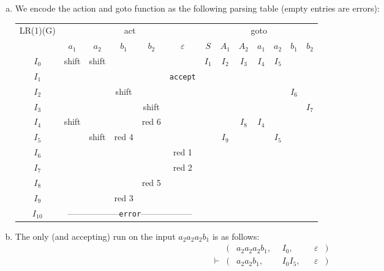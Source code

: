 \begin{solution}
\begin{enumerate}[(a)]
\item We encode the action and goto function as the following parsing table (empty entries are errors):
    \begin{center}
    \begin{tabular}{c | c c c c c | c c c c c c c }
      LR(1)(G) & \multicolumn{5}{c|}{act}                       & \multicolumn{7}{c}{goto}\\
               & $a_1$ & $a_2$ & $b_1$ & $b_2$ & $\varepsilon$ & $S$   & $A_1$ & $A_2$ & $a_1$ & $a_2$ & $b_1$ & $b_2$\\
      \hline
      $I_0$    & shift & shift &       &       &               & $I_1$ & $I_2$ & $I_3$ & $I_4$ & $I_5$ &\\
      $I_1$    &       &       &       &       &\texttt{accept}& \\
      $I_2$    &       &       & shift &       &               &       &       &       &       &       & $I_6$ &\\
      $I_3$    &       &       &       & shift &               &       &       &       &       &       &       & $I_7$\\
      $I_4$    & shift &       &       & red 6 &               &       &       & $I_8$ & $I_4$ &\\
      $I_5$    &       & shift & red 4 &       &               &       & $I_9$ &       &       & $I_5$ &\\
      $I_6$    &       &       &       &       & red 1         &\\
      $I_7$    &       &       &       &       & red 2         &\\
      $I_8$    &       &       &       & red 5 &               &\\
      $I_9$    &       &       & red 3 &       &               &\\
      $I_{10}$ & \multicolumn{5}{c|}{------------------\hspace{1ex}\texttt{error}\hspace{1ex}------------------} & \\
    \end{tabular}
    \end{center}
\item The only (and accepting) run on the input $a_2 a_2 a_2 b_1$ is as follows:
    \begin{align*}
             &(& a_2 a_2 a_2 b_1, & ~~ I_0, &&\varepsilon &)\\
      \vdash &(& a_2 a_2 b_1, & ~~ I_0 I_5, &&\varepsilon &)\\

\end{align*}
\end{enumerate}
\end{solution}
